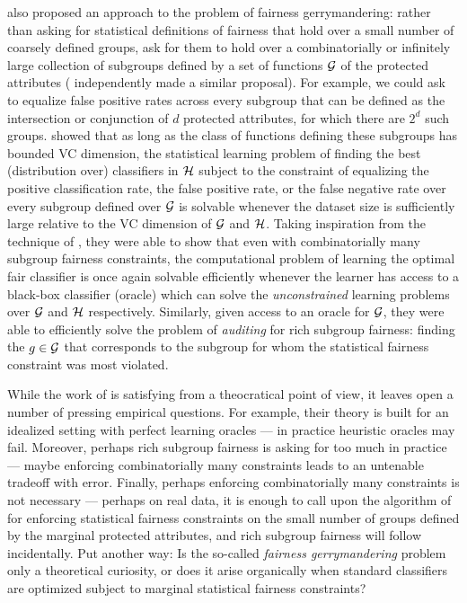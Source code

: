 \citet{KNRW18} also proposed an approach to the problem of fairness
gerrymandering: rather than asking for statistical definitions of
fairness that hold over a small number of coarsely defined groups, ask
for them to hold over a combinatorially or infinitely large collection
of subgroups defined by a set of functions $\mathcal{G}$ of the protected
attributes (\citet{multical} independently made a similar
proposal). For example, we could ask to equalize false positive rates
across every subgroup that can be defined as the intersection or
conjunction of $d$ protected attributes, for which there are $2^d$
such groups. \cite{KNRW18} showed that as long as the class of
functions defining these subgroups has bounded VC dimension, the
statistical learning problem of finding the best (distribution over)
classifiers in $\mathcal{H}$ subject to the constraint of equalizing the
positive classification rate, the false positive rate, or the false
negative rate over every subgroup defined over $\mathcal{G}$ is solvable
whenever the dataset size is sufficiently large relative to the VC
dimension of $\mathcal{G}$ and $\mathcal{H}$. Taking inspiration from the technique of
\citet{MSR}, they were able to show that even with
combinatorially many subgroup fairness constraints, the computational
problem of learning the optimal fair classifier is once again solvable
efficiently whenever the learner has access to a black-box classifier
(oracle) which can solve the \emph{unconstrained} learning problems
over $\mathcal{G}$ and $\mathcal{H}$ respectively. Similarly, given access to an
oracle for $\mathcal{G}$, they were able to efficiently solve the problem of
\textit{auditing} for rich subgroup fairness: finding the $g \in \mathcal{G}$
that corresponds to the subgroup for whom the statistical fairness
constraint was most violated.

While the work of \citet{KNRW18} is satisfying from a theocratical point of view, it leaves open a number of pressing empirical questions. For example, their theory is built for an idealized setting with perfect learning oracles --- in practice heuristic oracles may fail. Moreover, perhaps rich subgroup fairness is asking for too much in practice --- maybe enforcing combinatorially many constraints leads to an untenable tradeoff with error.  Finally, perhaps enforcing combinatorially many constraints is not necessary --- perhaps on real data, it is enough to call upon the algorithm of \cite{MSR} for enforcing statistical fairness constraints on the small number of groups defined by the marginal protected attributes, and rich subgroup fairness will follow incidentally. Put another way: Is the so-called \textit{fairness gerrymandering} problem only a theoretical curiosity, or does it arise organically when standard classifiers are optimized subject to marginal statistical fairness constraints?

